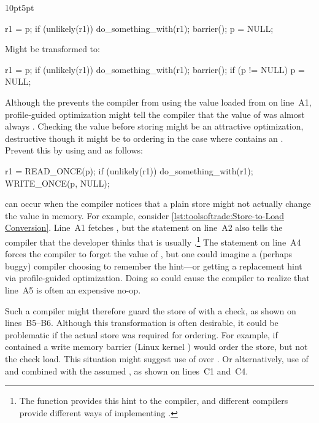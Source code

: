 \begin{description}[labelsep=.4em]
\begin{listing}[tb]
\begin{adjustwidth}{10pt}{5pt}
\footnotesize
\renewcommand{\myfvline}{A\arabic{FancyVerbLine}}
\begin{VerbatimT}
r1 = p;
if (unlikely(r1))
	do_something_with(r1);
barrier();
p = NULL;
\end{VerbatimT}
Might be transformed to:
\renewcommand{\myfvline}{B\arabic{FancyVerbLine}}
\begin{VerbatimT}
r1 = p;
if (unlikely(r1))
	do_something_with(r1);
barrier();
if (p != NULL)
	p = NULL;
\end{VerbatimT}
Although the  prevents the compiler from using the value
loaded from  on line~A1, profile-guided optimization might tell
the compiler that the value of  was almost always .
Checking the value before storing might be an attractive optimization,
destructive though it might be to ordering in the case where
 contains an .
Prevent this by using  and  as follows:
\renewcommand{\myfvline}{C\arabic{FancyVerbLine}}
\begin{VerbatimT}
r1 = READ_ONCE(p);
if (unlikely(r1))
	do_something_with(r1);
WRITE_ONCE(p, NULL);
\end{VerbatimT}
\end{adjustwidth}
\caption{Store-to-Load Conversion}
\label{lst:toolsoftrade:Store-to-Load Conversion}
\end{listing}

\item[Store-to-load transformations] can occur when the compiler notices
that a plain store might not actually change the value in memory.
For example, consider
\cref{lst:toolsoftrade:Store-to-Load Conversion}.
Line~A1 fetches , but the  statement on
line~A2 also tells the compiler that the developer thinks that
 is usually .\footnote{
	The  function provides this hint to the compiler,
	and different compilers provide different ways of implementing
	.}
The  statement on line~A4 forces the compiler to forget
the value of , but one could imagine a (perhaps buggy) compiler
choosing to remember the hint---or getting a replacement hint via
profile-guided optimization.
Doing so could cause the compiler to realize that line~A5 is often an
expensive no-op.

Such a compiler might therefore guard the store of 
with a check, as shown on lines~B5--B6.
Although this transformation is often desirable, it could be problematic
if the actual store was required for ordering.
For example, if  contained a write memory barrier
(Linux kernel ) would order the store, but not the
check load.
This situation might suggest use of  over
.
Or alternatively, use of  and  combined
with the assumed , as shown on lines~C1 and~C4.


\end{description}

